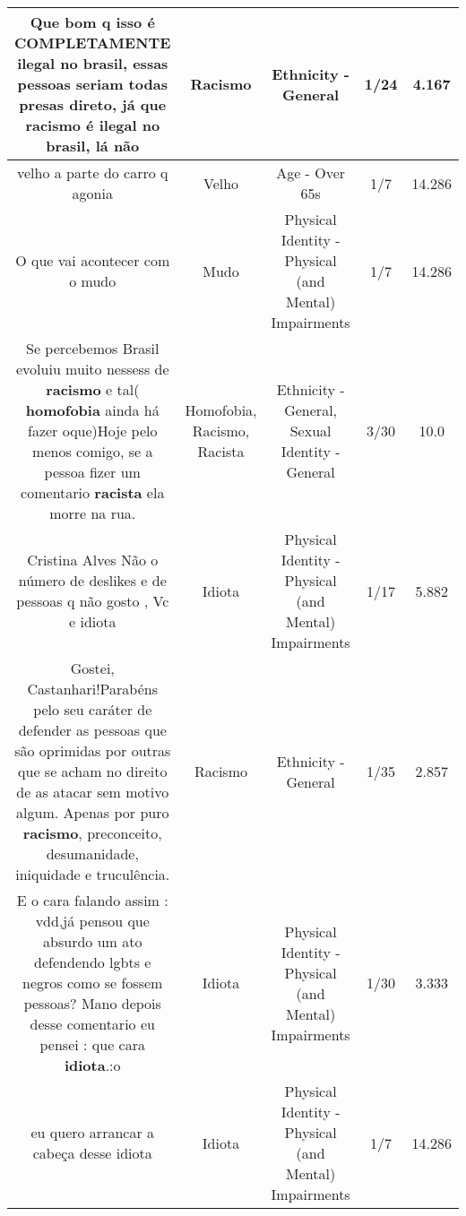 \documentclass[11pt]{article}
\newlength\mylength
\begin{document}
\begin{center}
\begin{longtable}{|C{.65\mylength}|C{.30\mylength}|C{.12\mylength}|C{.12\mylength}|C{.12\mylength}|}
  \small Que bom q isso é COMPLETAMENTE ilegal no brasil, essas pessoas seriam todas presas direto, já que \textbf{racismo} é ilegal no brasil, lá não\normalsize   & Racismo & Ethnicity - General & 1/24 & 4.167 \\  \hline
  \small velho a parte do carro q agonia\normalsize   & Velho & Age - Over 65s & 1/7 & 14.286 \\  \hline
  \small O que vai acontecer com o mudo\normalsize   & Mudo & Physical Identity - Physical (and Mental) Impairments & 1/7 & 14.286 \\  \hline
  \small Se percebemos Brasil evoluiu muito nessess de \textbf{racismo} e tal( \textbf{homofobia} ainda há fazer oque)Hoje pelo menos comigo, se a pessoa fizer um comentario \textbf{racista} ela morre na rua.\normalsize   & Homofobia, Racismo, Racista & Ethnicity - General, Sexual Identity - General & 3/30 & 10.0 \\  \hline
  \small Cristina Alves  Não o número de deslikes e de pessoas q não gosto , Vc e idiota\normalsize   & Idiota & Physical Identity - Physical (and Mental) Impairments & 1/17 & 5.882 \\  \hline
  \small Gostei, Castanhari!Parabéns pelo seu caráter de defender as pessoas que são oprimidas por outras que se acham no direito de as atacar sem motivo algum. Apenas por puro \textbf{racismo}, preconceito, desumanidade, iniquidade e truculência.\normalsize   & Racismo & Ethnicity - General & 1/35 & 2.857 \\  \hline
  \small E o cara falando assim : vdd,já pensou que absurdo um ato defendendo lgbts e negros como se fossem pessoas?   Mano depois desse comentario eu pensei : que cara \textbf{idiota}.:o\normalsize   & Idiota & Physical Identity - Physical (and Mental) Impairments & 1/30 & 3.333 \\  \hline
  \small eu quero arrancar a cabeça desse idiota\normalsize   & Idiota & Physical Identity - Physical (and Mental) Impairments & 1/7 & 14.286 \\  \hline

\end{longtable}
\end{center}
\end{document}
